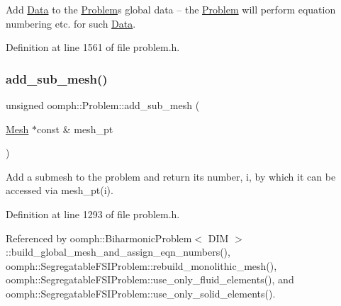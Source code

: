 Add \hyperlink{classoomph_1_1Data}{Data} to the \hyperlink{classoomph_1_1Problem}{Problem}\textquotesingle{}s global data -- the \hyperlink{classoomph_1_1Problem}{Problem} will perform equation numbering etc. for such \hyperlink{classoomph_1_1Data}{Data}. 



Definition at line 1561 of file problem.\+h.

\mbox{\label{classoomph_1_1Problem_a0cd05109bc2c003c5c0686e6aa55d847}} 
\subsubsection{\texorpdfstring{add\+\_\+sub\+\_\+mesh()}{add\_sub\_mesh()}}
{\footnotesize\ttfamily unsigned oomph\+::\+Problem\+::add\+\_\+sub\+\_\+mesh (\begin{DoxyParamCaption}\item[{\hyperlink{classoomph_1_1Mesh}{Mesh} $\ast$const \&}]{mesh\+\_\+pt }\end{DoxyParamCaption})\hspace{0.3cm}{\ttfamily [inline]}}



Add a submesh to the problem and return its number, i, by which it can be accessed via mesh\+\_\+pt(i). 



Definition at line 1293 of file problem.\+h.



Referenced by oomph\+::\+Biharmonic\+Problem$<$ D\+I\+M $>$\+::build\+\_\+global\+\_\+mesh\+\_\+and\+\_\+assign\+\_\+eqn\+\_\+numbers(), oomph\+::\+Segregatable\+F\+S\+I\+Problem\+::rebuild\+\_\+monolithic\+\_\+mesh(), oomph\+::\+Segregatable\+F\+S\+I\+Problem\+::use\+\_\+only\+\_\+fluid\+\_\+elements(), and oomph\+::\+Segregatable\+F\+S\+I\+Problem\+::use\+\_\+only\+\_\+solid\+\_\+elements().

\mbox{\label{classoomph_1_1Problem_a8856eae2daa9cea05e99bfcd4ef340a4}} 
